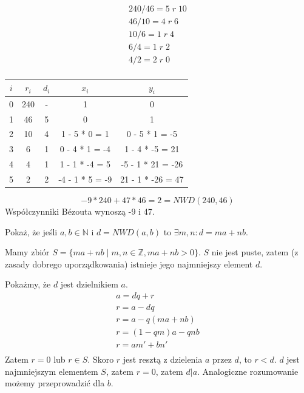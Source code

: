 \documentclass[12pt]{article}
\begin{document}
    \begin{gather*}
        240 / 46 = 5 \;r\; 10\\
        46 / 10 = 4 \;r\; 6\\
        10 / 6 = 1 \;r\; 4\\
        6 / 4 = 1 \;r\; 2\\
        4 / 2 = 2 \;r\; 0\\
    \end{gather*}

    \begin{table}[H]
        \centering
        \begin{tabular}{|c|c|c|c|c|}
            \hline
            $i$ &  $r_i$& $d_i$ &       $x_i$   &       $y_i$       \\
            \hline
            0 & 240 & - & 1 & 0           \\
            \hline
            1 & 46 & 5 & 0 & 1           \\
            \hline
            2 & 10 & 4 & 1 - 5 * 0 = 1 & 0 - 5 * 1 = -5    \\
            \hline
            3 & 6 & 1 & 0 - 4 * 1 = -4& 1 - 4 * -5 = 21   \\
            \hline
            4 & 4 & 1 & 1 - 1 * -4 = 5& -5 - 1 * 21 = -26 \\
            \hline
            5 & 2 & 2 &-4 - 1 * 5 = -9& 21 - 1 * -26 = 47 \\
            \hline

        \end{tabular}
    \end{table}

    \[-9 * 240 + 47 * 46 = 2 = NWD(240, 46)\]
    Współczynniki Bézouta wynoszą -9 i 47.\\

    \begin{exercise}
        Pokaż, że jeśli $a, b \in \mathbb{N}$ i $d = NWD(a, b)$ to $\exists m, n : d = ma + nb$.
    \end{exercise}

    Mamy zbiór $S = \{ma + nb \; | \; m, n \in \mathbb{Z}, ma + nb > 0\}$. $S$ nie jest puste, zatem (z zasady dobrego uporządkowania) istnieje jego najmniejszy element $d$.

    Pokażmy, że $d$ jest dzielnikiem $a$.
    \begin{gather*}
        a = dq + r\\
        r = a - dq\\
        r = a - q(ma + nb)\\
        r = (1 - qm)a - qnb\\
        r = am' + bn'\\
    \end{gather*}
    Zatem $r = 0$ lub $r \in S$. Skoro $r$ jest resztą z dzielenia $a$ przez $d$, to $r < d$. $d$ jest najmniejszym elementem $S$, zatem $r = 0$, zatem $d | a$. Analogiczne rozumowanie możemy przeprowadzić dla $b$.
\end{document}
